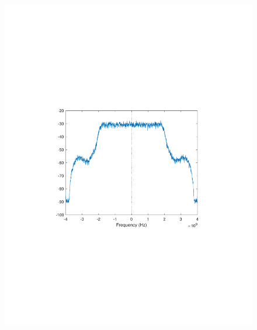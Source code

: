 \begin{refsection}
\begin{figure}[H]
	\centering
	\begin{minipage}{0.30\textwidth}
		\centering
		\includegraphics[clip, trim=4cm 8cm 4cm 8cm, width=1\textwidth]{./sdf/m_qam_system/figures/expResults/homodyne/4_4GBdInSig13dBc_AfFE.pdf}
		\label{fig:4GBdEyeFE2}
	\end{minipage}
	\begin{minipage}{0.30\textwidth}
		\centering

\end{minipage}
\end{figure}
\end{refsection}
